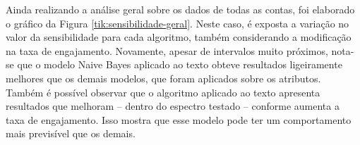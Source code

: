 \documentclass[oneside,openright,12pt]{ufsm_2015} %
\begin{document}
    \par Ainda realizando a análise geral sobre os dados de todas as contas, foi elaborado o gráfico da Figura \ref{tik:sensibilidade-geral}. Neste caso, é exposta a variação no valor da sensibilidade para cada algoritmo, também considerando a modificação na taxa de engajamento. Novamente, apesar de intervalos muito próximos, nota-se que o modelo Naive Bayes aplicado ao texto obteve resultados ligeiramente melhores que os demais modelos, que foram aplicados sobre os atributos. Também é possível observar que o algoritmo aplicado ao texto apresenta resultados que melhoram -- dentro do espectro testado -- conforme aumenta a taxa de engajamento. Isso mostra que esse modelo pode ter um comportamento mais previsível que os demais.
    
    \mydata
    
\end{document}
